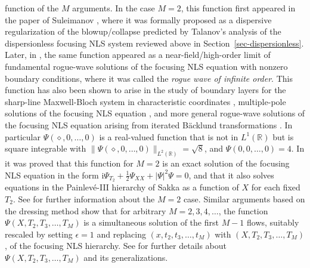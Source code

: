 \documentclass[12pt]{amsart}
\numberwithin{equation}{section}
\newcommand{\ii}{\mathrm{i}}
\begin{document}
function of the $M$ arguments.  In the case $M=2$, this function first 
appeared in the paper of Suleimanov \cite{Suleimanov17}, where it was formally 
proposed as a dispersive regularization of the blowup/collapse predicted by 
Talanov's analysis \cite{Talanov65} of the dispersionless focusing NLS system 
reviewed above in Section~\ref{sec-dispersionless}.  Later, in 
\cite{BilmanLM20}, the same function appeared as a near-field/high-order limit 
of fundamental rogue-wave solutions of the focusing NLS equation with nonzero 
boundary conditions, where it was called the \emph{rogue wave of infinite 
order}.  This function has also been shown to arise in the study of 
boundary layers for the sharp-line Maxwell-Bloch system in characteristic 
coordinates \cite{LiM24}, multiple-pole solutions of the focusing NLS equation 
\cite{BilmanB19}, 
and more general rogue-wave solutions of the focusing NLS equation arising from 
iterated B\"acklund transformations \cite{BilmanM22,BilmanM24b}.
In particular $\Psi(\diamond,0,\dots,0)$ is a real-valued function that is not 
in $L^1(\mathbb{R})$ but is square integrable with 
$\|\Psi(\diamond,0,\dots,0)\|_{L^2(\mathbb{R})}=\sqrt{8}$, and 
$\Psi(0,0,\dots,0)=4$.  In \cite{BilmanLM20} it was proved that this function 
for $M=2$ is an exact solution of the focusing NLS equation in the form 
$\ii \Psi_{T_2} + \frac{1}{2}\Psi_{XX}+|\Psi|^2\Psi=0$, and that it also 
solves equations in the Painlev\'e-III hierarchy of Sakka \cite{Sakka09} as a 
function of $X$ for each fixed $T_2$.  See \cite{BilmanM24} for further 
information about the $M=2$ case.  Similar arguments based on the dressing 
method show that for arbitrary $M=2,3,4,\dots$, the function 
$\Psi(X,T_2,T_3,\dots,T_M)$ is a simultaneous solution of the first $M-1$ 
flows, suitably rescaled by setting $\epsilon=1$ and replacing 
$(x,t_2,t_3,\dots,t_M)$ with $(X,T_2,T_3,\dots,T_M)$, of the focusing NLS 
hierarchy.  See \cite{BilmanBMY25} for further details about 
$\Psi(X,T_2,T_3,\dots,T_M)$ and its generalizations.
\end{document}
